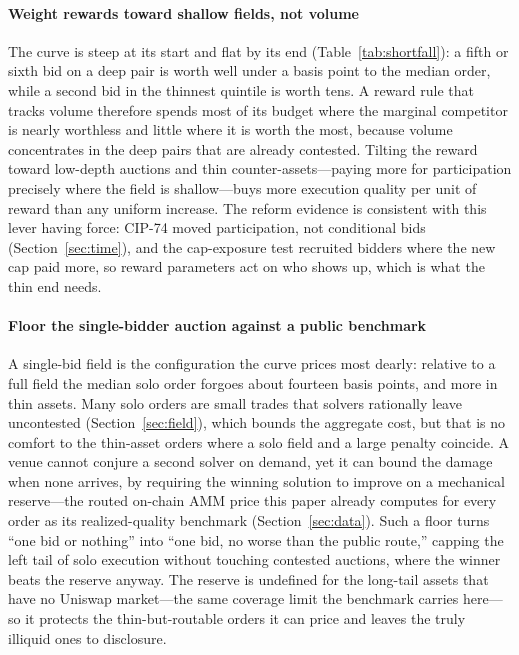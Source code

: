 \documentclass[11pt]{article}
\theoremstyle{plain}
\theoremstyle{definition}
\theoremstyle{remark}
\begin{document}
\paragraph{Weight rewards toward shallow fields, not volume} The curve is steep at its start and flat by its end (Table~\ref{tab:shortfall}): a fifth or sixth bid on a deep pair is worth well under a basis point to the median order, while a second bid in the thinnest quintile is worth tens. A reward rule that tracks volume therefore spends most of its budget where the marginal competitor is nearly worthless and little where it is worth the most, because volume concentrates in the deep pairs that are already contested. Tilting the reward toward low-depth auctions and thin counter-assets---paying more for participation precisely where the field is shallow---buys more execution quality per unit of reward than any uniform increase. The reform evidence is consistent with this lever having force: CIP-74 moved participation, not conditional bids (Section~\ref{sec:time}), and the cap-exposure test recruited bidders where the new cap paid more, so reward parameters act on who shows up, which is what the thin end needs.

\paragraph{Floor the single-bidder auction against a public benchmark} A single-bid field is the configuration the curve prices most dearly: relative to a full field the median solo order forgoes about fourteen basis points, and more in thin assets. Many solo orders are small trades that solvers rationally leave uncontested (Section~\ref{sec:field}), which bounds the aggregate cost, but that is no comfort to the thin-asset orders where a solo field and a large penalty coincide. A venue cannot conjure a second solver on demand, yet it can bound the damage when none arrives, by requiring the winning solution to improve on a mechanical reserve---the routed on-chain AMM price this paper already computes for every order as its realized-quality benchmark (Section~\ref{sec:data}). Such a floor turns ``one bid or nothing'' into ``one bid, no worse than the public route,'' capping the left tail of solo execution without touching contested auctions, where the winner beats the reserve anyway. The reserve is undefined for the long-tail assets that have no Uniswap market---the same coverage limit the benchmark carries here---so it protects the thin-but-routable orders it can price and leaves the truly illiquid ones to disclosure.
\end{document}
